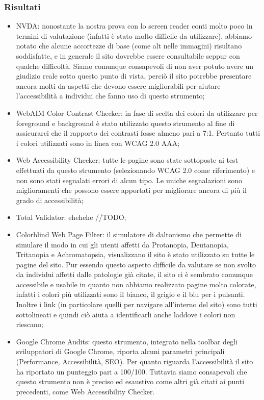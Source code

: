 \documentclass[12pt]{article}
\begin{document}
	\subsubsection{Risultati}
		\begin{itemize}
			\item NVDA: nonostante la nostra prova con lo screen reader conti molto poco in termini di valutazione (infatti è stato molto difficile da utilizzare), abbiamo notato che alcune accortezze di base (come alt nelle immagini) risultano soddisfatte, e in generale il sito dovrebbe essere consultabile seppur con qualche difficoltà. Siamo comunque consapevoli di non aver potuto avere un giudizio reale sotto questo punto di vista, perciò il sito potrebbe presentare ancora molti da aspetti che devono essere migliorabili per aiutare l'accessibilità a individui che fanno uso di questo strumento;
			\item WebAIM Color Contrast Checker: in fase di scelta dei colori da utilizzare per foreground e background è stato utilizzato questo strumento al fine di assicurarci che il rapporto dei contrasti fosse almeno pari a 7:1. Pertanto tutti i colori utilizzati sono in linea con WCAG 2.0 AAA;
			\item Web Accessibility Checker: tutte le pagine sono state sottoposte ai test effettuati da questo strumento (selezionando WCAG 2.0 come riferimento) e non sono stati segnalati errori di alcun tipo. Le uniche segnalazioni sono miglioramenti che possono essere apportati per migliorare ancora di più il grado di accessibilità;
			\item Total Validator: ehehehe //TODO;
			\item Colorblind Web Page Filter: il simulatore di daltonismo che permette di simulare il modo in cui gli utenti affetti da Protanopia, Deutanopia, Tritanopia e Achromatopsia, visualizzano il sito è stato utilizzato su tutte le pagine del sito. Pur essendo questo aspetto difficile da valutare se non svolto da individui affetti dalle patologie già citate, il sito ci è sembrato comunque accessibile e usabile in quanto non abbiamo realizzato pagine molto colorate, infatti i colori più utilizzati sono il bianco, il grigio e il blu per i pulsanti. Inoltre i link (in particolare quelli per navigare all'interno del sito) sono tutti sottolineati e quindi ciò aiuta a identificarli anche laddove i colori non riescano;
			\item Google Chrome Audits: questo strumento, integrato nella toolbar degli sviluppatori di Google Chrome, riporta alcuni parametri principali (Performance, Accessibilità, SEO). Per quanto riguarda l'accessibilità il sito ha riportato un punteggio pari a 100/100. Tuttavia siamo consapevoli che questo strumento non è preciso ed esaustivo come altri già citati ai punti precedenti, come Web Accessibility Checker.
		\end{itemize}
	
\end{document}
